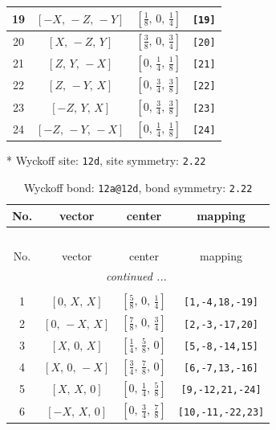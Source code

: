 \documentclass[fleqn,8pt]{jsarticle}
\begin{document}
\begin{longtable}{cccc}
19 & $\left[ - X,\, - Z,\, - Y \right]$ & $\left[ \frac{1}{8},\, 0,\, \frac{1}{4} \right]$ & {\tt [19]} \\ \hline
20 & $\left[ X,\, - Z,\, Y \right]$ & $\left[ \frac{3}{8},\, 0,\, \frac{3}{4} \right]$ & {\tt [20]} \\ \hline
21 & $\left[ Z,\, Y,\, - X \right]$ & $\left[ 0,\, \frac{1}{4},\, \frac{1}{8} \right]$ & {\tt [21]} \\ \hline
22 & $\left[ Z,\, - Y,\, X \right]$ & $\left[ 0,\, \frac{3}{4},\, \frac{3}{8} \right]$ & {\tt [22]} \\ \hline
23 & $\left[ - Z,\, Y,\, X \right]$ & $\left[ 0,\, \frac{3}{4},\, \frac{3}{8} \right]$ & {\tt [23]} \\ \hline
24 & $\left[ - Z,\, - Y,\, - X \right]$ & $\left[ 0,\, \frac{1}{4},\, \frac{1}{8} \right]$ & {\tt [24]} \\
\end{longtable}
* Wyckoff site: {\tt 12d}, site symmetry: {\tt 2.22}
\renewcommand{\arraystretch}{1.2}
\begin{longtable}{cccc}
\caption{Wyckoff bond: {\tt 12a@12d}, bond symmetry: {\tt 2.22}}
 \\
 \hline \hline
No. & vector & center & mapping \\ \hline \endfirsthead

\multicolumn{3}{l}{\tablename\ \thetable{}} \\
 \hline \hline
No. & vector & center & mapping \\ \hline \endhead

 \hline \hline
\multicolumn{3}{r}{\footnotesize\it continued ...} \\ \endfoot

 \hline \hline
\multicolumn{3}{r}{} \\ \endlastfoot

1 & $\left[ 0,\, X,\, X \right]$ & $\left[ \frac{5}{8},\, 0,\, \frac{1}{4} \right]$ & {\tt [1,-4,18,-19]} \\ \hline
2 & $\left[ 0,\, - X,\, X \right]$ & $\left[ \frac{7}{8},\, 0,\, \frac{3}{4} \right]$ & {\tt [2,-3,-17,20]} \\ \hline
3 & $\left[ X,\, 0,\, X \right]$ & $\left[ \frac{1}{4},\, \frac{5}{8},\, 0 \right]$ & {\tt [5,-8,-14,15]} \\ \hline
4 & $\left[ X,\, 0,\, - X \right]$ & $\left[ \frac{3}{4},\, \frac{7}{8},\, 0 \right]$ & {\tt [6,-7,13,-16]} \\ \hline
5 & $\left[ X,\, X,\, 0 \right]$ & $\left[ 0,\, \frac{1}{4},\, \frac{5}{8} \right]$ & {\tt [9,-12,21,-24]} \\ \hline
6 & $\left[ - X,\, X,\, 0 \right]$ & $\left[ 0,\, \frac{3}{4},\, \frac{7}{8} \right]$ & {\tt [10,-11,-22,23]} \\
\end{longtable}
\end{document}
